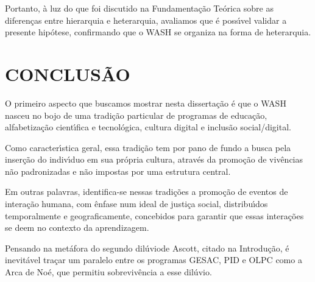 \documentclass[
12pt,		%
openright,	%
twoside,  %
a4paper,			%
chapter=TITLE,		%
english,			%
french,				%
spanish,			%
brazil				%
]{USPSC-classe/USPSC}
\begin{document}
Portanto, \`a luz do que foi discutido na Fundamenta\c{c}\~ao Te\'orica sobre as diferen\c{c}as entre hierarquia e heterarquia, avaliamos que \'e poss\'{\i}vel validar a presente hip\'otese, confirmando que o WASH se organiza na forma de heterarquia.









\chapter[CONCLUS\~AO]{CONCLUS\~AO}\label{CONCLUS\~AO}
O primeiro aspecto que buscamos mostrar nesta disserta\c{c}\~ao \'e que o WASH nasceu no bojo de uma tradi\c{c}\~ao particular de programas de educa\c{c}\~ao, alfabetiza\c{c}\~ao cient\'{\i}fica e tecnol\'ogica, cultura digital e inclus\~ao social/digital.









Como caracter\'{\i}stica geral, essa tradi\c{c}\~ao tem por pano de fundo a busca pela inser\c{c}\~ao do indiv\'{\i}duo em sua pr\'opria cultura, atrav\'es da promo\c{c}\~ao de viv\^encias n\~ao padronizadas e n\~ao impostas por uma estrutura central.









Em outras palavras, identifica-se nessas tradi\c{c}\~oes a promo\c{c}\~ao de eventos de intera\c{c}\~ao humana, com \^enfase num ideal de justi\c{c}a social, distribu\'{\i}dos temporalmente e geograficamente, concebidos para garantir que essas intera\c{c}\~oes se deem no contexto da aprendizagem.









Pensando na met\'afora do \textquotedbl segundo dil\'uvio\textquotedbl  de Ascott, citado na Introdu\c{c}\~ao, \'e inevit\'avel tra\c{c}ar um paralelo entre os programas GESAC, PID e OLPC como a \textquotedbl Arca de No\'e\textquotedbl , que permitiu sobreviv\^encia a esse \textquotedbl dil\'uvio\textquotedbl .
\end{document}
